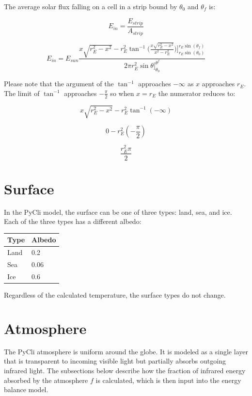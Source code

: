 \documentclass[12pt]{article} %
\begin{document}
The average solar flux falling on a cell in a strip bound by $\theta_0$ and $\theta_f$ is:

$$E_{in} = \frac{E_{strip}}{A_{strip}}$$

$$\boxed{E_{in} = E_{sun}\frac{x \sqrt{r_{E}^2 - x^2} -  r_{E}^2 \tan^{-1}\bigg({\frac{x \sqrt{r_{E}^2 - x^2}}{x^2 - r_{E}^2 }}\bigg)\bigg]_{r_{E}\sin(\theta_0)}^{r_{E}\sin(\theta_f)}}{2 \pi r_{E}^2 \sin{\theta}]_{\theta_0}^{\theta^f}}}$$

Please note that the argument of the $\tan^{-1}$ approaches $-\infty$ as $x$ approaches $r_{E}$. The limit of $\tan^{-1}$ approaches $-\frac{\pi}{2}$ so when $x = r_{E}$ the numerator reduces to:

$$x \sqrt{r_{E}^2 - x^2} -  r_{E}^2 \tan^{-1}(-\infty)$$

$$0 -  r_{E}^2 (-\frac{\pi}{2})$$

$$\frac{r_{E}^2 \pi}{2}$$

\newpage
\section{Surface}
\label{sec:surface}

In the PyCli model, the surface can be one of three types: land, sea, and ice. Each of the three types has a different albedo:

\begin{center}
\begin{tabular}{|m{4 cm}| m{2 cm}|} \hline
\textbf{Type} & \textbf{Albedo} \\ \hline
Land & 0.2\\ \hline
Sea & 0.06\\ \hline
Ice & 0.6\\ \hline
\end{tabular}
\end{center}

Regardless of the calculated temperature, the surface types do not change.


\newpage
\section{Atmosphere}
\label{sec:atmos}

The PyCli atmosphere is uniform around the globe. It is modeled as a single layer that is transparent to incoming visible light but partially absorbs outgoing infrared light. The subsections below describe how the fraction of infrared energy absorbed by the atmosphere $f$ is calculated, which is then input into the energy balance model.
\end{document}
